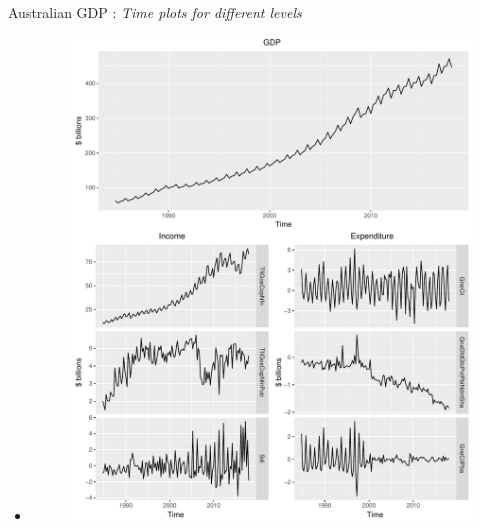 \documentclass[11pt,xcolor=dvipsnames,table]{beamer} %
\begin{document}
\begin{frame}{Australian GDP : \textit{Time plots for different levels}}
\begin{itemize}[<+-| alert@+>]
	\item[] 
	\begin{figure}

		\centering
		\small
		\includegraphics[scale=0.30]{Figs/TS-plots/TSplots-INC-EXP.pdf}
		
	\end{figure}
	
\end{itemize}
\end{frame}


\end{document}
